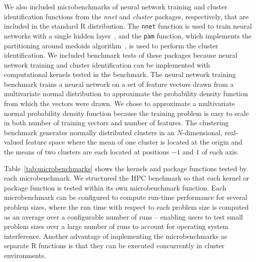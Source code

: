 We also included microbenchmarks of neural network training and cluster
  identification functions from the \textit{nnet} and \textit{cluster} packages,
  respectively, that are included in the standard R distribution.
The \texttt{nnet} function is used to train neural networks with a single hidden
  layer~\cite{ripley:pattern96}, and the \texttt{pam} function, which implements
  the partitioning around medoids algorithm~\cite{chu:kmedoids, reynolds:clustering},
  is used to perform the cluster identification.
We included benchmark tests of these packages because neural network training
  and cluster identification can be implemented with computational kernels
  tested in the benchmark.
The neural network training benchmark trains a neural network on a set of
  feature vectors drawn from a multivariate normal distribution to approximate
  the probability density function from which the vectors were drawn.
We chose to approximate a multivariate normal probability density function
  because the training problem is easy to scale in both number of training
  vectors and number of features.
The clustering benchmark generates normally distributed clusters in an
  $N$-dimensional, real-valued feature space where the mean of one cluster is
  located at the origin and the means of two clusters are each located at
  positions $-1$ and $1$ of each axis.

Table~\ref{tab:microbenchmarks} shows the kernels and package functions tested
  by each microbenchmark.
We structured the HPC benchmark so that each kernel or package function is
  tested within its own microbenchmark function.
Each microbenchmark can be configured to compute run-time performance for
  several problem sizes, where the run time with respect to each problem size
  is computed as an average over a configurable number of runs -- enabling
  users to test small problem sizes over a large number of runs to account
  for operating system interference.
Another advantage of implementing the microbenchmarks as separate R functions
  is that they can be executed concurrently in cluster environments.

